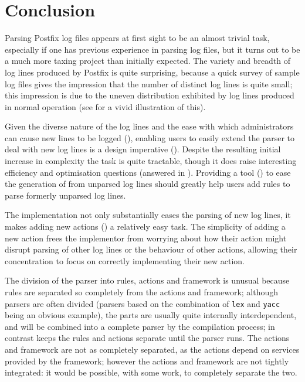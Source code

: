 \section{Conclusion}

\label{conclusion}

Parsing Postfix log files appears at first sight to be an almost trivial
task, especially if one has previous experience in parsing log files, but
it turns out to be a much more taxing project than initially expected.  The
variety and breadth of log lines produced by Postfix is quite surprising,
because a quick survey of sample log files gives the impression that the
number of distinct log lines is quite small; this impression is due to the
uneven distribution exhibited by log lines produced in normal operation
(see  for a vivid illustration of this).


Given the diverse nature of the log lines and the ease with which
administrators can cause new lines to be logged (), enabling users to easily extend the parser to deal with new
log lines is a design imperative ().  Despite the
resulting initial increase in complexity the task is quite tractable,
though it does raise interesting efficiency and optimisation questions
(answered in ).  Providing a tool
() to ease the generation of \regexes{} from
unparsed log lines should greatly help users add rules to parse formerly
unparsed log lines.


The implementation not only substantially eases the parsing of new log
lines, it makes adding new actions () a
relatively easy task.  The simplicity of adding a new action frees the
implementor from worrying about how their action might disrupt parsing of
other log lines or the behaviour of other actions, allowing their
concentration to focus on correctly implementing their new action.


The division of the parser into rules, actions and framework is unusual
because rules are separated so completely from the actions and framework;
although parsers are often divided (parsers based on the combination of
\texttt{lex} and \texttt{yacc}~\cite{lex-and-yacc} 
being an obvious example), the parts are usually quite internally
interdependent, and will be combined into a complete parser by the
compilation process; in contrast \parsername{} keeps the rules and actions
separate until the parser runs.  The actions and framework are not as
completely separated, as the actions depend on services provided by the
framework; however the actions and framework are not tightly integrated: it
would be possible, with some work, to completely separate the two.


